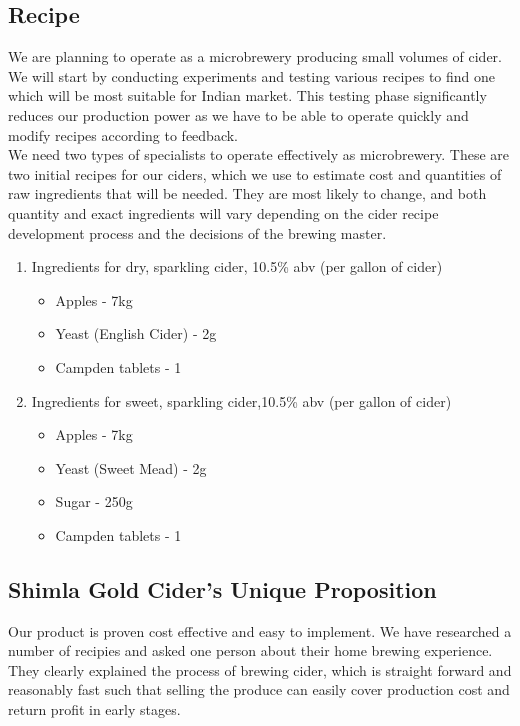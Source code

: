 \documentclass[11pt]{article}
\begin{document}
  \subsection{Recipe}
We are planning to operate as a microbrewery producing small volumes of cider. We will start by conducting experiments and testing various recipes to find one which will be most suitable for Indian market. This testing phase significantly reduces our production power as we have to be able to operate quickly and modify recipes according to feedback.\\

\noindent We need two types of specialists to operate effectively as microbrewery. These are two initial recipes for our ciders, which we use to estimate cost and quantities of raw ingredients that will be needed. They are most likely to change, and both quantity and exact ingredients will vary depending on the cider recipe development process and the decisions of the brewing master.

		\begin{enumerate}
			\item Ingredients for dry, sparkling cider, 10.5\% abv (per gallon of cider) \\
				\begin{itemize}
					\item Apples - 7kg \\
					\item Yeast (English Cider) - 2g \\
					\item Campden tablets - 1 \\
				\end{itemize}

			\item Ingredients for sweet, sparkling cider,10.5\% abv (per gallon of cider) \\
				\begin{itemize}
					\item Apples - 7kg \\
					\item Yeast (Sweet Mead) - 2g \\
					\item Sugar - 250g \\
					\item Campden tablets - 1 \\
				\end{itemize}
			\end{enumerate}

  \subsection{Shimla Gold Cider's Unique Proposition}
Our product is proven cost effective and easy to implement. We have researched a number of recipies and asked one person about their home brewing experience. They clearly explained the process of brewing cider, which is straight forward and reasonably fast such that selling the produce can easily cover production cost and return profit in early stages.
  
\end{document}
